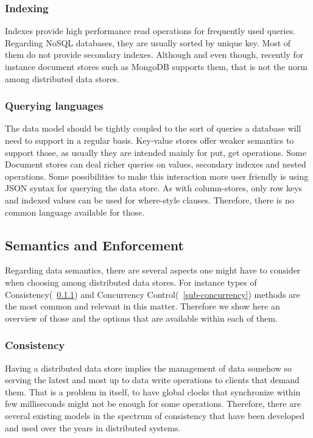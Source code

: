 	\subsubsection{Indexing}
	Indexes provide high performance read operations for frequently used queries. Regarding NoSQL databases, they are usually sorted by unique key. Most of them do not provide secondary indexes. Although and even though, recently for instance document stores such as MongoDB supports them, that is not the norm among distributed data stores. %
	
	\subsubsection{Querying languages}
	The data model should be tightly coupled to the sort of queries a database will need to support in a regular basis. Key-value stores offer weaker semantics to support those, as usually they are intended mainly for put, get operations. Some Document stores can deal richer queries on values, secondary indexes and nested operations. Some possibilities to make this interaction more user friendly is using JSON syntax for querying the data store. As with column-stores, only row keys and indexed values can be used for where-style clauses. Therefore, there is no common language available for those.

\subsection{Semantics and Enforcement}

Regarding data semantics, there are several aspects one might have to consider when choosing among distributed data stores. For instance types of Consistency(~\ref{sub-consistency}) and Concurrency Control(~\ref{sub-concurrency}) methods are the most common and relevant in this matter. Therefore we show here an overview of those and the options that are available within each of them.

	\subsubsection{Consistency}\label{sub-consistency}
	Having a distributed data store implies the management of data somehow so serving the latest and most up to data write operations to clients that demand them. That is a problem in itself, to have global clocks that synchronize within few milliseconds might not be enough for some operations. Therefore, there are several existing models in the spectrum of consistency that have been developed and used over the years in distributed systems.

